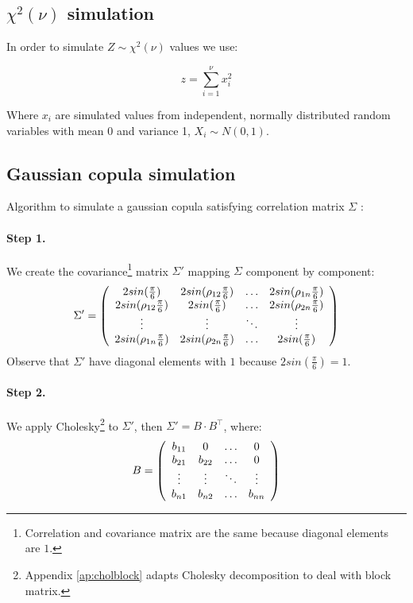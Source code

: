 \documentclass[a4paper,12pt,final]{article}
\begin{document}
\subsection{$\chi^2(\nu)$ simulation}
\label{ap:chi2sim}

In order to simulate $Z \sim \chi^2(\nu)$ values we use:

\begin{displaymath}
z = \sum_{i=1}^{\nu} x_i^2
\end{displaymath}

Where $x_i$ are simulated values from independent, normally distributed 
random variables with mean 0 and variance 1, $X_i \sim N(0,1)$.

\subsection{Gaussian copula simulation}
\label{ap:gaussiancopu}
Algorithm to simulate a gaussian copula satisfying correlation matrix $\Sigma$ 
\cite{copu:wang} \cite{copu:pricing}:

\paragraph{Step 1.} We create the covariance\footnote{Correlation and covariance 
matrix are the same because diagonal elements are $1$.} matrix $\Sigma'$ mapping 
$\Sigma$ component by component:
\begin{displaymath}
\Sigma' = \left( 
\begin{array}{cccc}
2 sin(\frac{\pi}{6})           & 2 sin(\rho_{12} \frac{\pi}{6}) & \ldots & 2 sin(\rho_{1n} \frac{\pi}{6})\cr
2 sin(\rho_{12} \frac{\pi}{6}) & 2 sin(\frac{\pi}{6})           & \ldots & 2 sin(\rho_{2n} \frac{\pi}{6})\cr
\vdots                         & \vdots                         & \ddots  & \vdots   \cr
2 sin(\rho_{1n} \frac{\pi}{6}) & 2 sin(\rho_{2n} \frac{\pi}{6}) & \ldots & 2 sin(\frac{\pi}{6})
\end{array}
\right)
\end{displaymath}
Observe that $\Sigma'$ have diagonal elements with $1$ because $2 sin(\frac{\pi}{6}) = 1$.

\paragraph{Step 2.} We apply Cholesky\footnote{Appendix \ref{ap:cholblock} adapts Cholesky 
decomposition to deal with block matrix.} to $\Sigma'$, then $\Sigma' = B \cdot B^{\top}$, 
where:
\begin{displaymath}
B = 
\left(
\begin{array}{cccc}
b_{11}   & 0        & \ldots & 0       \cr
b_{21}   & b_{22}   & \ldots & 0       \cr
\vdots  & \vdots  & \ddots & \vdots \cr
b_{n1}   & b_{n2}   & \ldots & b_{nn}
\end{array}
\right)
\end{displaymath}
\end{document}
